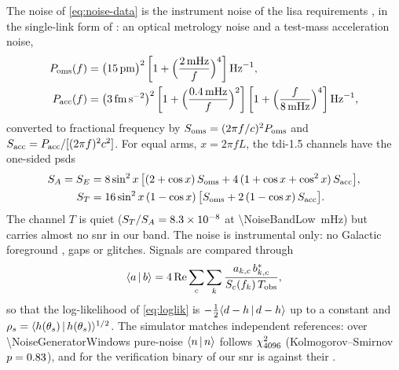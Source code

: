 The noise of \cref{eq:noise-data} is the instrument noise of the \ac{lisa} requirements
\citep{lisasst2018lisa}, in the single-link form of \citet[Issue~1.1]{babak2021lisa}: an optical
metrology noise and a test-mass acceleration noise,
\begin{align}
  P_{\rm oms}(f) &= \bigl(\qty{\NoiseOms}{\pico\metre}\bigr)^2
  \left[1+\Bigl(\frac{\qty{2}{\milli\hertz}}{f}\Bigr)^4\right]\unit{\per\hertz}, \nonumber\\
  P_{\rm acc}(f) &= \bigl(\qty{\NoiseAcc}{\femto\metre\per\second\squared}\bigr)^2
  \left[1+\Bigl(\frac{\qty{0.4}{\milli\hertz}}{f}\Bigr)^2\right]
  \left[1+\Bigl(\frac{f}{\qty{8}{\milli\hertz}}\Bigr)^4\right]\unit{\per\hertz},
  \label{eq:noise-single-link}
\end{align}
converted to fractional frequency by $S_{\rm oms} = (2\pi f/c)^2P_{\rm oms}$ and
$S_{\rm acc} = P_{\rm acc}/[(2\pi f)^2c^2]$. For equal arms, $x = 2\pi fL$, the \acs{tdi}-1.5 channels
have the one-sided \acp{psd} \citep[eqs.~19, 127--129]{babak2021lisa}
\begin{align}
  S_A = S_E &= 8\sin^2x\,\bigl[(2+\cos x)\,S_{\rm oms}
  + 4\,(1 + \cos x + \cos^2 x)\,S_{\rm acc}\bigr], \nonumber\\
  S_T &= 16\sin^2x\,(1-\cos x)\,\bigl[S_{\rm oms} + 2\,(1-\cos x)\,S_{\rm acc}\bigr].
  \label{eq:noise-psd}
\end{align}
The channel $T$ is quiet ($S_T/S_A = \num{8.3e-8}$ at \qty{\NoiseBandLow}{\milli\hertz}) but
carries almost no \ac{snr} in our band. The noise is instrumental only: no Galactic foreground
\citep{karnesis2021characterization}, gaps or glitches. Signals are compared through
\begin{equation}
  \langle a \,|\, b \rangle = 4\,\mathrm{Re}\sum_{c}\sum_{k}\frac{a_{k,c}\,b^*_{k,c}}{S_c(f_k)\,T_{\rm obs}},
  \label{eq:inner}
\end{equation}
so that the log-likelihood of \cref{eq:loglik} is $-\tfrac12\langle d-h \,|\, d-h \rangle$ up to a constant and
$\rho_s = \langle h(\theta_s) \,|\, h(\theta_s) \rangle^{1/2}$. The simulator matches independent references: over
\num{\NoiseGeneratorWindows} pure-noise  $\langle n \,|\, n \rangle$ follows $\chi^2_{4096{}}$
(Kolmogorov--Smirnov $p = 0.83{}$), and for the verification binary of
\citet[Table~VII]{strub2022bayesian} our \acs{snr} is \NoiseStrubSnr{} against their
\NoiseStrubSnrTheirs{}.
